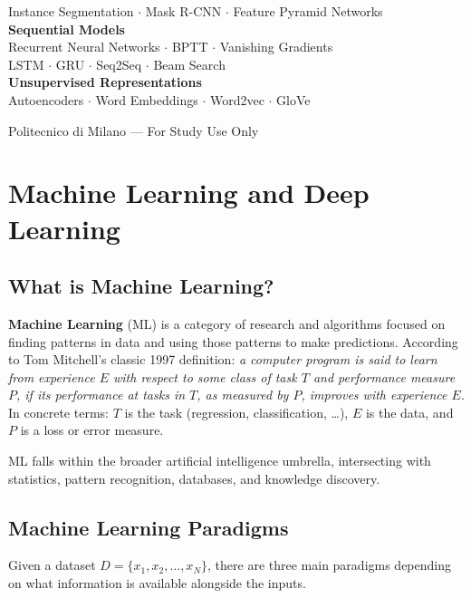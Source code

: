 \documentclass[11pt,a4paper]{article}
\newcommand{\term}[1]{\textcolor{DefGreen}{\textbf{#1}}\index{#1}}
\begin{document}
\begin{titlepage}
\begin{tcolorbox}[colback=LightBlue,colframe=AccentBlue,width=0.88\textwidth,boxrule=1pt,arc=4pt]
Instance Segmentation $\cdot$ Mask R-CNN $\cdot$ Feature Pyramid Networks\\[0.5em]
\textbf{Sequential Models}\\
Recurrent Neural Networks $\cdot$ BPTT $\cdot$ Vanishing Gradients\\
LSTM $\cdot$ GRU $\cdot$ Seq2Seq $\cdot$ Beam Search\\[0.5em]
\textbf{Unsupervised Representations}\\
Autoencoders $\cdot$ Word Embeddings $\cdot$ Word2vec $\cdot$ GloVe
\end{tcolorbox}
\vfill{\color{NoteGray}\small Politecnico di Milano --- For Study Use Only}
\end{titlepage}

\setcounter{tocdepth}{2}   %
\tableofcontents\newpage

\section{Machine Learning and Deep Learning}

\subsection{What is Machine Learning?}

\term{Machine Learning} (ML) is a category of research and algorithms focused on finding patterns in data and using those patterns to make predictions. According to Tom Mitchell's classic 1997 definition: \emph{a computer program is said to learn from experience $E$ with respect to some class of task $T$ and performance measure $P$, if its performance at tasks in $T$, as measured by $P$, improves with experience $E$}. In concrete terms: $T$ is the task (regression, classification, \ldots), $E$ is the data, and $P$ is a loss or error measure.

ML falls within the broader artificial intelligence umbrella, intersecting with statistics, pattern recognition, databases, and knowledge discovery.

\subsection{Machine Learning Paradigms}

Given a dataset $D = \{x_1, x_2, \ldots, x_N\}$, there are three main paradigms depending on what information is available alongside the inputs.
\end{document}

